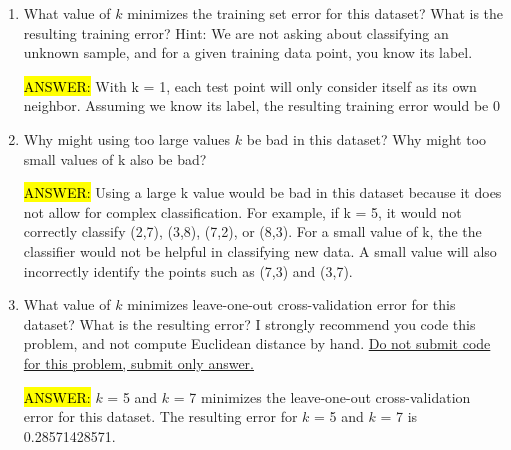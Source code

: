 \documentclass[11pt]{article}
\begin{document}
\begin{enumerate}
\item {} What value of $k$ minimizes the training set error for this dataset? What is
the resulting training error? Hint: We are not asking about classifying an unknown sample, and for a given training data point, you know its label. 

\hl{ANSWER:} With k = 1, each test point will only consider itself as its own neighbor. Assuming we know its label, the resulting training error would be 0%

\item {} Why might using too large values $k$ be bad in this dataset? Why might too small values of k also be bad?

\hl{ANSWER:} Using a large k value would be bad in this dataset because it does not allow for complex classification. For example, if k = 5, it would not correctly classify (2,7), (3,8), (7,2), or (8,3).
For a small value of k, the the classifier would not be helpful in classifying new data. A small value will also incorrectly identify the points such as (7,3) and (3,7).

\item {} What value of $k$ minimizes leave-one-out cross-validation error for this
dataset? What is the resulting error? I strongly recommend you code this problem, and not compute Euclidean distance by hand. {\underline{Do not submit code for this problem, submit only answer.}}

\hl{ANSWER:} $k$ = 5 and $k$ = 7 minimizes the leave-one-out cross-validation error for this dataset. The resulting error for $k$ = 5 and $k$ = 7 is 0.28571428571.

\end{enumerate}


\end{document}
